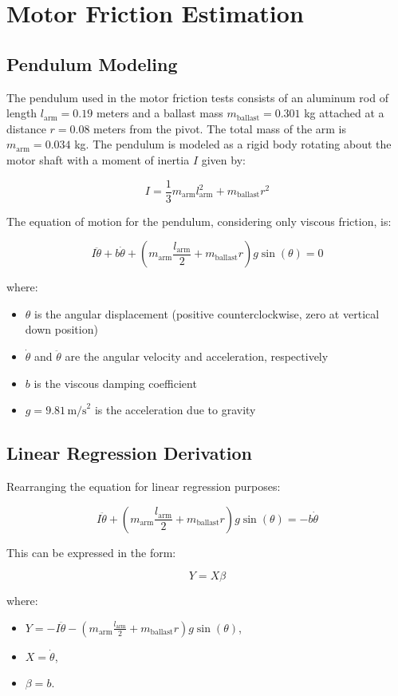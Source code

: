 \section{Motor Friction Estimation}
\subsection{Pendulum Modeling}

The pendulum used in the motor friction tests consists of an aluminum rod of length \( l_{\text{arm}} = 0.19 \) meters and a ballast mass \( m_{\text{ballast}} = 0.301 \) kg attached at a distance \( r = 0.08 \) meters from the pivot. The total mass of the arm is \( m_{\text{arm}} = 0.034 \) kg. The pendulum is modeled as a rigid body rotating about the motor shaft with a moment of inertia \( I \) given by:

\[
I = \frac{1}{3} m_{\text{arm}} l_{\text{arm}}^2 + m_{\text{ballast}} r^2
\]

The equation of motion for the pendulum, considering only viscous friction, is:

\[
I \ddot{\theta} + b \dot{\theta} + (m_{\text{arm}} \frac{l_{\text{arm}}}{2} + m_{\text{ballast}} r) g \sin(\theta) = 0
\]

where:
\begin{itemize}
    \item \( \theta \) is the angular displacement (positive counterclockwise, zero at vertical down position)
    \item \( \dot{\theta} \) and \( \ddot{\theta} \) are the angular velocity and acceleration, respectively
    \item \( b \) is the viscous damping coefficient
    \item \( g = 9.81 \, \text{m/s}^2 \) is the acceleration due to gravity
\end{itemize}

\subsection{Linear Regression Derivation}
Rearranging the equation for linear regression purposes:

\[
    I \ddot{\theta} + (m_{\text{arm}} \frac{l_{\text{arm}}}{2} + m_{\text{ballast}} r) g \sin(\theta) = -b \dot{\theta}
\]

This can be expressed in the form:

\[
Y = X \beta
\]

where:
\begin{itemize}
    \item \( Y = -I \ddot{\theta} - (m_{\text{arm}} \frac{l_{\text{arm}}}{2} + m_{\text{ballast}} r) g \sin(\theta) \),
    \item \( X = \dot{\theta} \),
    \item \( \beta = b \).
\end{itemize}

